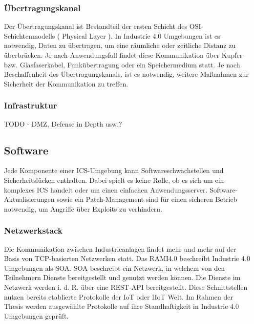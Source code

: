 \subsubsection{Übertragungskanal}
Der Übertragungskanal ist Bestandteil der ersten Schicht des OSI-Schichtenmodells ( Physical Layer ). In Industrie 4.0 Umgebungen ist es notwendig, Daten zu übertragen, um eine räumliche oder zeitliche Distanz zu überbrücken. Je nach Anwendungsfall findet diese Kommunikation über Kupfer- bzw. Glasfaserkabel, Funkübertragung oder ein Speichermedium statt. Je nach Beschaffenheit des Übertragungskanals, ist es notwendig, weitere Maßnahmen zur Sicherheit der Kommunikation zu treffen. 

\subsubsection{Infrastruktur}
TODO - DMZ, Defense in Depth usw.?

\subsection{Software}
Jede Komponente einer \ac{ICS}-Umgebung kann Softwareschwachstellen und Sicherheitslücken enthalten. Dabei spielt es keine Rolle, ob es sich um ein komplexes \ac{ICS} handelt oder um einen einfachen Anwendungsserver. Software-Aktualisierungen sowie ein Patch-Management sind für einen sicheren Betrieb notwendig, um Angriffe über Exploits zu verhindern.

\subsubsection{Netzwerkstack}
Die Kommunikation zwischen Industrieanlagen findet mehr und mehr auf der Basis von TCP-basierten Netzwerken statt. Das \ac{RAMI4.0} beschreibt Industrie 4.0 Umgebungen als \ac{SOA}. \ac{SOA} beschreibt ein Netzwerk, in welchem von den Teilnehmern Dienste bereitgestellt und genutzt werden können. Die Dienste im Netzwerk werden i. d. R. über eine \ac{REST}-\ac{API} bereitgestellt. Diese Schnittstellen nutzen bereits etablierte Protokolle der \ac{IoT} oder \ac{IIoT} Welt. Im Rahmen der Thesis werden ausgewählte Protokolle auf ihre Standhaftigkeit in Industrie 4.0 Umgebungen geprüft.

